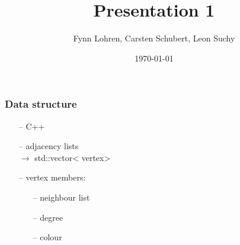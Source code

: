 \documentclass{beamer}[14pt]
\begin{document}
	\title{Presentation 1}
	\author{Fynn Lohren, Carsten Schubert, Leon Suchy}
	\date{\today}
	\frame{\titlepage}
	
	\begin{frame}
		\frametitle{Data structure}
		
		\begin{itemize}
			\item[--] C++
			\item[--] adjacency lists\\
			$\rightarrow$ {\color{cyan}std}::{\color{blue}vector}\textless{\color{blue} vertex}\textgreater
			
			\pause 
			
			\item[--] vertex members:
			\begin{itemize}
				\item[--] neighbour list
				\item[--] degree
				\item[--] colour
			\end{itemize}
			 
		\end{itemize}
	\end{frame}
\end{document}
